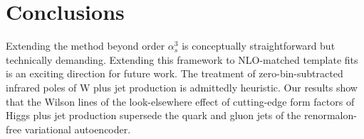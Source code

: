 \section{Conclusions}\label{sec:conclusions}

Extending the method beyond order $\alpha_s^3$ is conceptually
straightforward but technically demanding. Extending this framework to
NLO-matched template fits is an exciting direction for future work. The
treatment of zero-bin-subtracted infrared poles of W plus jet production
is admittedly heuristic. Our results show that the Wilson lines of the
look-elsewhere effect of cutting-edge form factors of Higgs plus jet
production supersede the quark and gluon jets of the renormalon-free
variational autoencoder.

